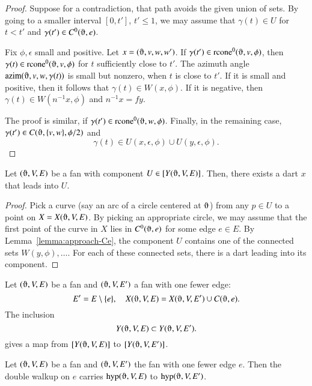 \begin{proof}
Suppose for a contradiction, that path avoids the given union
of sets.  By going to a smaller interval $[0,t']$, $t'\le 1$,
we may assume that $\gamma(t)\in U$ for $t < t'$ and $\gamma(t')\in
C^0(\orgn,e)$.  

Fix $\phi,\epsilon$ small and positive.
Let $x = (\orgn,v,w,w')$.
If $\gamma(t')\in \op{rcone}^0(\orgn,v,\phi)$, then $\gamma(t)\in
\op{rcone}^0(\orgn,v,\phi)$ for $t$ sufficiently close to $t'$.  The
azimuth angle $\op{azim}(\orgn,v,w,\gamma(t))$ is small but nonzero, 
when
$t$ is close to $t'$.  If it is small and positive, then 
it follows that $\gamma(t)\in W(x,\phi)$.  If it is negative, then
$\gamma(t)\in W(n^{-1} x,\phi)$ and $n^{-1} x = f y$.

The proof is similar, if $\gamma(t')\in \op{rcone}^0(\orgn,w,\phi)$.
Finally, in the remaining case, 
$\gamma(t')\in C(\orgn,\{v,w\},\phi/2)$ and 
$$\gamma(t)\in U(x,\epsilon,\phi)\cup U(y,\epsilon,\phi).$$
\end{proof}

\begin{lemma}
Let $(\orgn,V,E)$ be a fan with component $U\in\comp{Y(\orgn,V,E)}$.
Then, there exists a
dart $x$ that leads into $U$.
\end{lemma}

\begin{proof}  Pick a curve (say an arc of a
circle centered at $\orgn$) from any $p\in U$ to a point on $X=X(\orgn,V,E)$.
By picking an appropriate circle, 
we may assume that the first point of the curve in $X$ lies
in $C^0(\orgn,e)$ for some edge $e\in E$.  
By Lemma~\ref{lemma:approach-Ce},
the component $U$ contains one of the connected
sets $W(y,\phi),\ldots$.
For each of these connected sets, there is a dart leading
into its component.
\end{proof}

\begin{lemma}
Let $(\orgn,V,E)$ be a fan and $(\orgn,V,E')$
a fan with one fewer edge:
  $$
  E' = E\setminus\{e\}, \quad X(\orgn,V,E) = X(\orgn,V,E')\cup C(\orgn,e).
  $$
The inclusion  $$Y(\orgn,V,E) \subset Y(\orgn,V,E').
   $$
gives a map
from $\comp{Y(\orgn,V,E)}$ to
$\comp{Y(\orgn,V,E')}$.
\end{lemma}

\begin{lemma}\label{lemma:pre-walkup}
Let $(\orgn,V,E)$ be a fan and $(\orgn,V,E')$
the fan with one fewer edge $e$.
Then the double walkup on $e$
carries $\op{hyp}(\orgn,V,E)$ to
$\op{hyp}(\orgn,V,E')$.
\end{lemma}

